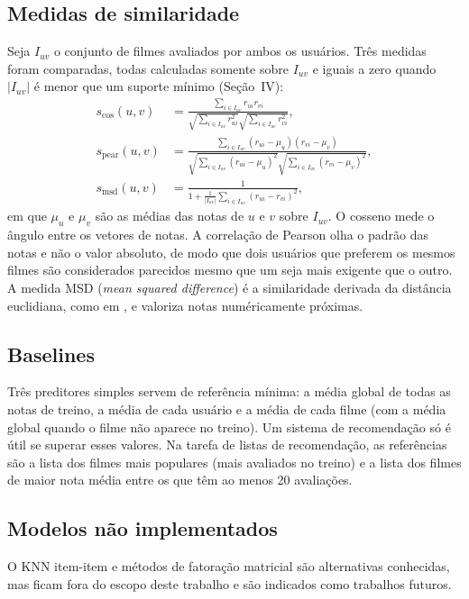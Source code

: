 \documentclass[conference]{IEEEtran}
\begin{document}
\subsection{Medidas de similaridade}
Seja $I_{uv}$ o conjunto de filmes avaliados por ambos os usu\'arios. Tr\^es medidas foram comparadas, todas calculadas somente sobre $I_{uv}$ e iguais a zero quando $|I_{uv}|$ \'e menor que um suporte m\'inimo (Se\c{c}\~ao~IV):
\begin{align}
s_{\cos}(u,v)&=\frac{\sum_{i\in I_{uv}} r_{ui}r_{vi}}{\sqrt{\sum_{i\in I_{uv}} r_{ui}^2}\sqrt{\sum_{i\in I_{uv}} r_{vi}^2}},\\
s_{\mathrm{pear}}(u,v)&=\frac{\sum_{i\in I_{uv}}(r_{ui}-\mu_u)(r_{vi}-\mu_v)}{\sqrt{\sum_{i\in I_{uv}}(r_{ui}-\mu_u)^2}\sqrt{\sum_{i\in I_{uv}}(r_{vi}-\mu_v)^2}},\\
s_{\mathrm{msd}}(u,v)&=\frac{1}{1+\frac{1}{|I_{uv}|}\sum_{i\in I_{uv}}(r_{ui}-r_{vi})^2},
\end{align}
em que $\mu_u$ e $\mu_v$ s\~ao as m\'edias das notas de $u$ e $v$ sobre $I_{uv}$. O cosseno mede o \^angulo entre os vetores de notas. A correla\c{c}\~ao de Pearson olha o padr\~ao das notas e n\~ao o valor absoluto, de modo que dois usu\'arios que preferem os mesmos filmes s\~ao considerados parecidos mesmo que um seja mais exigente que o outro. A medida MSD (\emph{mean squared difference}) \'e a similaridade derivada da dist\^ancia euclidiana, como em \cite{hug2020}, e valoriza notas num\'ericamente pr\'oximas.

\subsection{Baselines}
Tr\^es preditores simples servem de refer\^encia m\'inima: a m\'edia global de todas as notas de treino, a m\'edia de cada usu\'ario e a m\'edia de cada filme (com a m\'edia global quando o filme n\~ao aparece no treino). Um sistema de recomenda\c{c}\~ao s\'o \'e \'util se superar esses valores. Na tarefa de listas de recomenda\c{c}\~ao, as refer\^encias s\~ao a lista dos filmes mais populares (mais avaliados no treino) e a lista dos filmes de maior nota m\'edia entre os que t\^em ao menos 20 avalia\c{c}\~oes.

\subsection{Modelos n\~ao implementados}
O KNN item-item \cite{sarwar2001} e m\'etodos de fatora\c{c}\~ao matricial s\~ao alternativas conhecidas, mas ficam fora do escopo deste trabalho e s\~ao indicados como trabalhos futuros.
\end{document}
